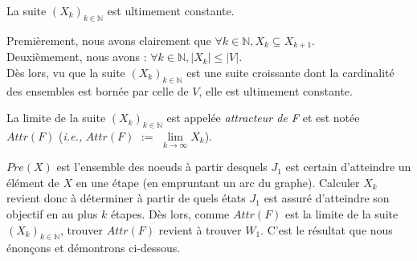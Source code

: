 	
	\begin{propriete}
		\label{prop:suiteUltConst}
		La suite $(X_{k})_{k \in \mathbb{N}}$ est ultimement constante. 
	\end{propriete}
	\begin{demonstration}
		Premièrement, nous avons clairement que  $\forall k \in \mathbb{N}, X_{k} \subseteq X_{k+1}$.\\
		Deuxièmement, nous avons : $\forall k \in \mathbb{N}, |X_{k}| \leq |V| $.\\
		Dès lors, vu que la suite $(X_{k})_{k \in \mathbb{N}}$ est une suite croissante dont la cardinalité des ensembles est bornée par celle de $V$, elle est ultimement constante.\\
		
	\end{demonstration}
	
	
	
	\begin{defi}
		La limite de la suite $(X_{k})_{k \in \mathbb{N}}$ est appelée \textit{attracteur de F} et est notée $Attr(F)$ (\emph{i.e.,} $Attr(F)$ $:=$ $\lim \limits _{k \rightarrow \infty} X_k$).
	\end{defi}
	
	
	$Pre(X)$ est l'ensemble des noeuds à partir desquels $J_1$ est certain d'atteindre un élément de $X$ en une étape (en empruntant un arc du graphe). Calculer $X_k$ revient donc à déterminer à partir de quels états $J_1$ est assuré d'atteindre son objectif en au plus $k$ étapes. Dès lors, comme $Attr(F)$ est la limite de la suite $(X_k)_{k \in \mathbb{N}}$, trouver $Attr(F)$ revient à trouver $W_1$. C'est le résultat que nous énonçons et démontrons ci-dessous.
	

